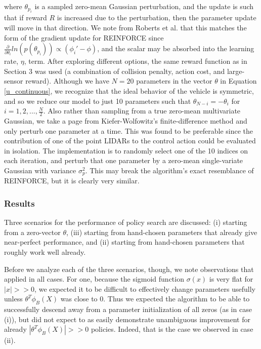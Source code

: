 \documentclass{article}
\begin{document}
where $\theta_{p_i}$ is a sampled zero-mean Gaussian perturbation, and the update is such that if reward $R$ is increased due to the perturbation, then the parameter update will move in that direction.  We note from Roberts et al. that this matches the form of the gradient update for REINFORCE since $\frac{\partial}{\partial \theta_i} ln (p(\theta_{p_i} )) \propto (\phi_i' -\phi)$, and the scalar may be absorbed into the learning rate, $\eta$, term.  After exploring different options, the same reward function as in Section 3 was used (a combination of collision penalty, action cost, and large-sensor reward).  Although we have $N=20$ parameters in the vector $\theta$ in Equation \ref{u_continuous}, we recognize that the ideal behavior of the vehicle is symmetric, and so we reduce our model to just 10 parameters such that $\theta_{N-i} = - \theta_{i} $ for $i = 1,2,..., \frac{N}{2}$.  Also rather than sampling from a true zero-mean multivariate Gaussian, we take a page from Kiefer-Wolfowitz's finite-difference method and only perturb one parameter at a time.  This was found to be preferable since the contribution of one of the point LIDARs to the control action could be evaluated in isolation.  The implementation is to randomly select one of the 10 indices on each iteration, and perturb that one parameter by a zero-mean single-variate Gaussian with variance $\sigma_p^2$.  This may break the algorithm's exact resemblance of REINFORCE, but it is clearly very similar.

\subsubsection{Results}

Three scenarios for the performance of policy search are discussed: (i) starting from a zero-vector $\theta$, (iii) starting from hand-chosen parameters that already give near-perfect performance, and (ii) starting from hand-chosen parameters that roughly work well already.

Before we analyze each of the three scenarios, though, we note observations that applied in all cases.  For one, because the sigmoid function $\sigma(x)$ is very flat for $|x|>>0$, we expected it to be difficult to effectively change parameters usefully unless $\theta^T \phi_B(X)$ was close to 0.  Thus we expected the algorithm to be able to successfully descend away from a parameter initialization of all zeros (as in case (i)), but did not expect to as easily demonstrate unambiguous improvement for already $|\theta^T \phi_B(X)| >> 0$ policies.  Indeed, that is the case we observed in case (ii).
\end{document}
